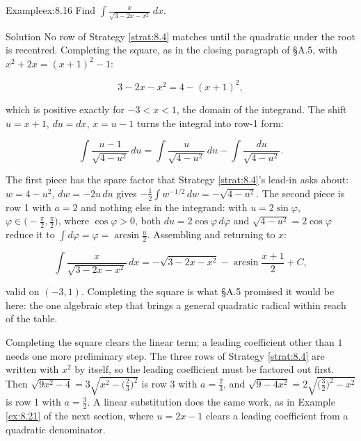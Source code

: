 \documentclass[a4paper,12pt,oneside]{memoir}
\begin{document}
\begin{workedexample}
\begin{envexample}{Example}{ex:8.16}{}
Find \(\displaystyle\int \frac{x}{\sqrt{3 - 2x - x^{2}}}\,dx\).
\end{envexample}
\begin{envsolution}{Solution}{}{}
No row of Strategy \ref{strat:8.4} matches until the quadratic under the root is recentred. Completing the square, as in the closing paragraph of §A.5, with \(x^{2} + 2x = (x + 1)^{2} - 1\):

\[ 3 - 2x - x^{2} = 4 - (x + 1)^{2}, \]

which is positive exactly for \(-3 < x < 1\), the domain of the integrand. The shift \(u = x + 1\), \(du = dx\), \(x = u - 1\) turns the integral into row-1 form:

\[ \int \frac{u - 1}{\sqrt{4 - u^{2}}}\,du = \int \frac{u}{\sqrt{4 - u^{2}}}\,du - \int \frac{du}{\sqrt{4 - u^{2}}}. \]

The first piece has the spare factor that Strategy \ref{strat:8.4}’s lead-in asks about: \(w = 4 - u^{2}\), \(dw = -2u\,du\) gives \(-\tfrac{1}{2}\int w^{-1/2}\,dw = -\sqrt{4 - u^{2}}\). The second piece is row 1 with \(a = 2\) and nothing else in the integrand: with \(u = 2\sin\varphi\), \(\varphi \in \bigl(-\tfrac{\pi}{2}, \tfrac{\pi}{2}\bigr)\), where \(\cos\varphi > 0\), both \(du = 2\cos\varphi\,d\varphi\) and \(\sqrt{4 - u^{2}} = 2\cos\varphi\) reduce it to \(\int d\varphi = \varphi = \arcsin\tfrac{u}{2}\). Assembling and returning to \(x\):

\[ \int \frac{x}{\sqrt{3 - 2x - x^{2}}}\,dx = -\sqrt{3 - 2x - x^{2}} - \arcsin\frac{x + 1}{2} + C, \]

valid on \((-3, 1)\). Completing the square is what §A.5 promised it would be here: the one algebraic step that brings a general quadratic radical within reach of the table. \qedmark
\end{envsolution}
\end{workedexample}
Completing the square clears the linear term; a leading coefficient other than \(1\) needs one more preliminary step. The three rows of Strategy \ref{strat:8.4} are written with \(x^{2}\) by itself, so the leading coefficient must be factored out first. Then \(\sqrt{9x^{2} - 4} = 3\sqrt{x^{2} - \bigl(\tfrac{2}{3}\bigr)^{2}}\) is row 3 with \(a = \tfrac{2}{3}\), and \(\sqrt{9 - 4x^{2}} = 2\sqrt{\bigl(\tfrac{3}{2}\bigr)^{2} - x^{2}}\) is row 1 with \(a = \tfrac{3}{2}\). A linear substitution does the same work, as in Example \ref{ex:8.21} of the next section, where \(u = 2x - 1\) clears a leading coefficient from a quadratic denominator.
\end{document}
